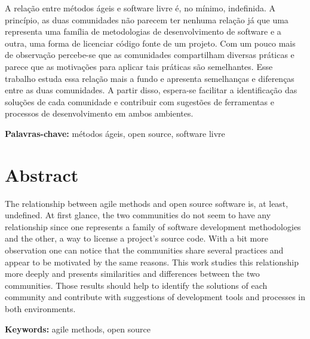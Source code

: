 \documentclass[11pt,twoside,a4paper]{book}
\begin{document}
A relação entre métodos ágeis e software livre é, no mínimo,
indefinida. A princípio, as duas comunidades não parecem ter nenhuma
relação já que uma representa uma família de metodologias de
desenvolvimento de software e a outra, uma forma de licenciar código
fonte de um projeto. Com um pouco mais de observação percebe-se que as
comunidades compartilham diversas práticas e parece que as motivações
para aplicar tais práticas são semelhantes. Esse trabalho estuda essa
relação mais a fundo e apresenta semelhanças e diferenças entre as
duas comunidades. A partir disso, espera-se facilitar a identificação
das soluções de cada comunidade e contribuir com sugestões de
ferramentas e processos de desenvolvimento em ambos ambientes.

\noindent \textbf{Palavras-chave:} métodos ágeis, open source,
software livre

\chapter*{Abstract}

The relationship between agile methods and open source software is, at
least, undefined. At first glance, the two communities do not seem to
have any relationship since one represents a family of software
development methodologies and the other, a way to license a project's
source code. With a bit more observation one can notice that the
communities share several practices and appear to be motivated by the
same reasons. This work studies this relationship more deeply and
presents similarities and differences between the two
communities. Those results should help to identify the solutions of
each community and contribute with suggestions of development tools
and processes in both environments.

\noindent \textbf{Keywords:} agile methods, open source

\tableofcontents %

\end{document}
